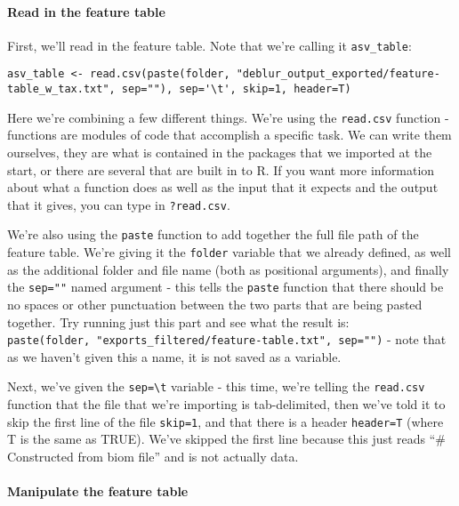 \documentclass[
]{book}
\begin{document}
\paragraph{Read in the feature table}\label{read-in-the-feature-table-1}

First, we'll read in the feature table. Note that we're calling it \texttt{asv\_table}:

\begin{verbatim}
asv_table <- read.csv(paste(folder, "deblur_output_exported/feature-table_w_tax.txt", sep=""), sep='\t', skip=1, header=T)
\end{verbatim}

Here we're combining a few different things. We're using the \texttt{read.csv} function - functions are modules of code that accomplish a specific task. We can write them ourselves, they are what is contained in the packages that we imported at the start, or there are several that are built in to R. If you want more information about what a function does as well as the input that it expects and the output that it gives, you can type in \texttt{?read.csv}.

We're also using the \texttt{paste} function to add together the full file path of the feature table. We're giving it the \texttt{folder} variable that we already defined, as well as the additional folder and file name (both as positional arguments), and finally the \texttt{sep=""} named argument - this tells the \texttt{paste} function that there should be no spaces or other punctuation between the two parts that are being pasted together. Try running just this part and see what the result is: \texttt{paste(folder,\ "exports\_filtered/feature-table.txt",\ sep="")} - note that as we haven't given this a name, it is not saved as a variable.

Next, we've given the \texttt{sep=\textquotesingle{}\textbackslash{}t\textquotesingle{}} variable - this time, we're telling the \texttt{read.csv} function that the file that we're importing is tab-delimited, then we've told it to skip the first line of the file \texttt{skip=1}, and that there is a header \texttt{header=T} (where T is the same as TRUE). We've skipped the first line because this just reads ``\# Constructed from biom file'' and is not actually data.

\paragraph{Manipulate the feature table}\label{manipulate-the-feature-table-1}
\end{document}
